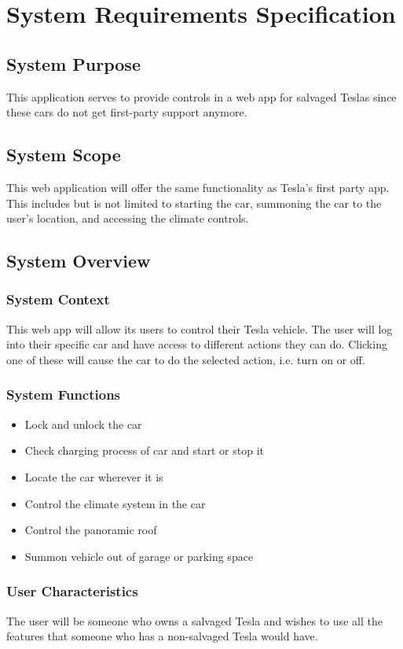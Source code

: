 \documentclass[onecolumn, draftclsnofoot,10pt, compsoc]{IEEEtran}
\begin{document}
\section{System Requirements Specification}
\subsection{System Purpose}
This application serves to provide controls in a web app for salvaged Teslas since these cars do not get first-party support anymore.
\subsection{System Scope}
This web application will offer the same functionality as Tesla's first party app. 
This includes but is not limited to starting the car, summoning the car to the user's location, and accessing the climate controls.

\subsection{System Overview}
\subsubsection{System Context}
This web app will allow its users to control their Tesla vehicle. The user will log into their specific car and have access to different actions they can do. Clicking one of these will cause the car to do the selected action, i.e. turn on or off.
\subsubsection{System Functions}
\begin{itemize}
    \item Lock and unlock the car
    \item Check charging process of car and start or stop it
    \item Locate the car wherever it is
    \item Control the climate system in the car
    \item Control the panoramic roof
    \item Summon vehicle out of garage or parking space
\end{itemize}
\subsubsection{User Characteristics}
The user will be someone who owns a salvaged Tesla and wishes to use all the features that someone who has a non-salvaged Tesla would have.
\end{document}
